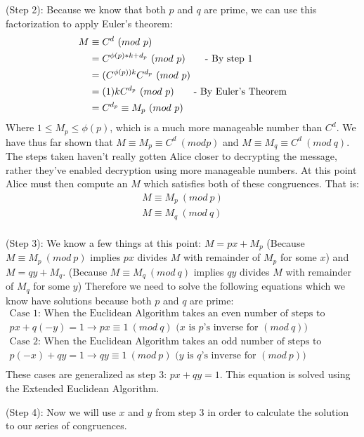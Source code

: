 \documentclass[11pt]{article}
\theoremstyle{definition}
\begin{document}
\begin{enumerate}
(Step 2): Because we know that both $p$ and $q$ are prime, we can use this factorization to apply Euler’s theorem:
\begin{align*}
M &\equiv C^d\ (mod\ p)\\
&= C^{\phi(p)*k+d_p}\ (mod\ p)			\text{\qquad- By step 1}\\
&= (C^{\phi(p))k}C^{d_p}\ (mod\ p)\\
&= (1)kC^{d_p}\ (mod\ p)				\text{\qquad- By Euler’s Theorem}\\
&= C^{d_p} \equiv M_p\ (mod\ p)\\
\end{align*} 
Where $1 \leq M_p \leq \phi(p)$, which is a much more manageable number than $C^d$. 
We have thus far shown that $M \equiv M_p \equiv C^d\ (mod p)$ and $M \equiv M_q \equiv C^d\ (mod\ q)$. The steps taken haven’t really gotten Alice closer to decrypting the message, rather they’ve enabled decryption using more manageable numbers. At this point Alice must then compute an $M$ which satisfies both of these congruences. That is:
\begin{align*}
M \equiv M_p\ (mod\ p) \\ 
M \equiv M_q\ (mod\ q)\\
\end{align*} 

(Step 3): We know a few things at this point: $M = px + M_p$ (Because $M \equiv M_p\ (mod\ p)$ implies $px$ divides $M$ with remainder of $M_p$ for some $x$) and $M = qy + M_q$. (Because $M \equiv M_q\ (mod\ q)$ implies $qy$ divides $M$ with remainder of $M_q$ for some $y$) Therefore we need to solve the following equations which we know have solutions because both $p$ and $q$ are prime:
\begin{align*}
\text{Case 1: When the Euclidean Algorithm takes an even number of steps to complete} \\
px + q(-y) = 1 \rightarrow px \equiv 1\ (mod\ q) \text{ ($x$ is $p$’s inverse for $(mod\ q)$) }\\
\text{Case 2: When the Euclidean Algorithm takes an odd number of steps to complete} \\
p(-x) + qy = 1 \rightarrow qy \equiv 1\ (mod\ p) \text{ ($y$ is $q$’s inverse for $(mod\ p)$) }\\
\end{align*} 
These cases are generalized as step 3: $px + qy = 1$. This equation is solved using the Extended Euclidean Algorithm.

(Step 4): Now we will use $x$ and $y$ from step 3 in order to calculate the solution to our series of congruences. 


\end{enumerate}
\end{document}
